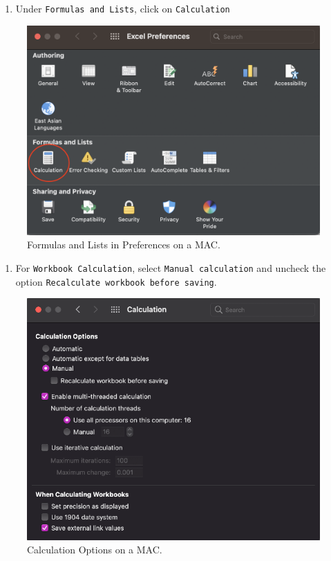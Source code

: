 \documentclass[
  12pt,
  letterpaper,
]{book}
\providecommand{\tightlist}{%
  \setlength{\itemsep}{0pt}\setlength{\parskip}{0pt}}
\begin{document}
\begin{enumerate}
\def\labelenumi{\arabic{enumi}.}
\setcounter{enumi}{1}
\tightlist
\item
  Under \texttt{Formulas\ and\ Lists}, click on \texttt{Calculation}
\end{enumerate}

\begin{figure}

{\centering \includegraphics[width=0.6\linewidth]{images/manual-calculation2} 

}

\caption{Formulas and Lists in Preferences on a MAC.}\label{fig:manual-calculation2}
\end{figure}

\begin{enumerate}
\def\labelenumi{\arabic{enumi}.}
\setcounter{enumi}{2}
\tightlist
\item
  For \texttt{Workbook\ Calculation}, select \texttt{Manual\ calculation} and uncheck the option \texttt{Recalculate\ workbook\ before\ saving}.
\end{enumerate}

\begin{figure}

{\centering \includegraphics[width=0.6\linewidth]{images/manual-calculation3} 

}

\caption{Calculation Options on a MAC.}\label{fig:manual-calculation3}
\end{figure}
\end{document}
